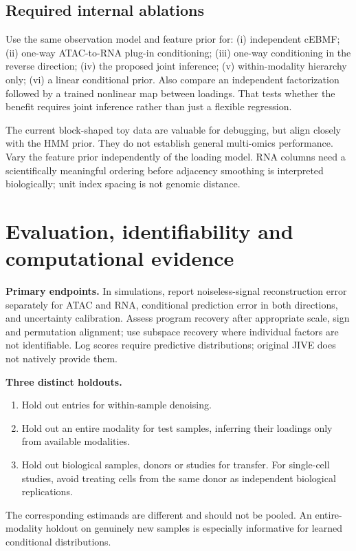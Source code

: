 \documentclass[11pt,a4paper]{article}
\numberwithin{equation}{section}
\begin{document}
\subsection*{Required internal ablations}
Use the same observation model and feature prior for:
(i) independent cEBMF;
(ii) one-way ATAC-to-RNA plug-in conditioning;
(iii) one-way conditioning in the reverse direction;
(iv) the proposed joint inference;
(v) within-modality hierarchy only;
(vi) a linear conditional prior.
Also compare an independent factorization followed by a trained nonlinear
map between loadings. That tests whether the benefit requires joint
inference rather than just a flexible regression.

The current block-shaped toy data are valuable for debugging, but align
closely with the HMM prior. They do not establish general multi-omics
performance. Vary the feature prior independently of the loading model.
RNA columns need a scientifically meaningful ordering before adjacency
smoothing is interpreted biologically; unit index spacing is not genomic
distance.

\clearpage
\section{Evaluation, identifiability and computational evidence}

\textbf{Primary endpoints.} In simulations, report noiseless-signal
reconstruction error separately for ATAC and RNA, conditional prediction
error in both directions, and uncertainty calibration. Assess program
recovery after appropriate scale, sign and permutation alignment; use
subspace recovery where individual factors are not identifiable.
Log scores require predictive distributions; original JIVE does not
natively provide them.

\textbf{Three distinct holdouts.}
\begin{enumerate}
\item Hold out entries for within-sample denoising.
\item Hold out an entire modality for test samples, inferring their
loadings only from available modalities.
\item Hold out biological samples, donors or studies for transfer.
For single-cell studies, avoid treating cells from the same donor as
independent biological replications.
\end{enumerate}
The corresponding estimands are different and should not be pooled.
An entire-modality holdout on genuinely new samples is especially
informative for learned conditional distributions.
\end{document}
